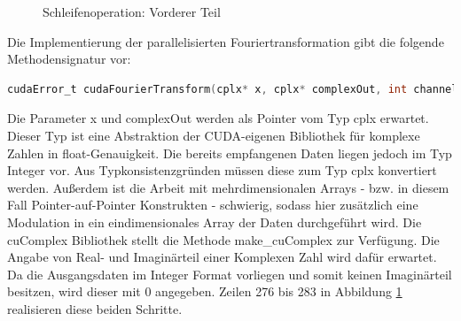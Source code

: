 \begin{figure}[h!]
	
	
	
	
	
	\caption{Schleifenoperation: Vorderer Teil}
	\label{fig:whileSecond}
\end{figure}

Die Implementierung der parallelisierten Fouriertransformation gibt die folgende Methodensignatur vor:
\begin{lstlisting}[language=C, frame=none]
	cudaError_t cudaFourierTransform(cplx* x, cplx* complexOut, int channelNb, int size)
\end{lstlisting}
Die Parameter x und complexOut werden als Pointer vom Typ cplx erwartet. Dieser Typ ist eine Abstraktion der CUDA-eigenen Bibliothek für komplexe Zahlen in float-Genauigkeit. Die bereits empfangenen Daten liegen jedoch im Typ Integer vor. Aus Typkonsistenzgründen müssen diese zum Typ cplx konvertiert werden. Außerdem ist die Arbeit mit mehrdimensionalen Arrays - bzw. in diesem Fall Pointer-auf-Pointer Konstrukten - schwierig, sodass hier zusätzlich eine Modulation in ein eindimensionales Array der Daten durchgeführt wird. Die cuComplex Bibliothek stellt die Methode make\_cuComplex zur Verfügung. Die Angabe von Real- und Imaginärteil einer Komplexen Zahl wird dafür erwartet. Da die Ausgangsdaten im Integer Format vorliegen und somit keinen Imaginärteil besitzen, wird dieser mit 0 angegeben. Zeilen 276 bis 283 in Abbildung \ref{fig:whileSecond} realisieren diese beiden Schritte.

